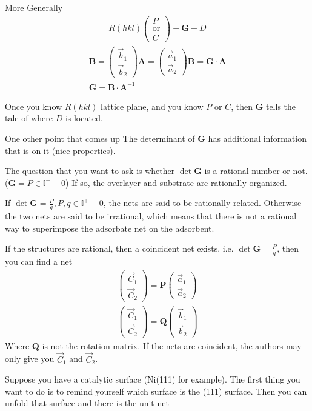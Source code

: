 \documentclass{article}
\newcommand{\matr}[1]{\bm{#1}}
\newcommand{\aone}[0]{\vec{a}_1}
\newcommand{\atwo}[0]{\vec{a}_2}
\newcommand{\bone}[0]{\vec{b}_1}
\newcommand{\btwo}[0]{\vec{b}_2}
\newcommand{\pmat}[1]{\begin{pmatrix}#1\end{pmatrix}}
\begin{document}
\begin{section}{More Generally}
	\begin{align*}
		R(hkl)\pmat{P\\\text{or}\\ C} - \matr{G} - D
	\end{align*}
	\begin{align*}
		\matr{B}=\pmat{\bone\\\btwo}
		\matr{A}=\pmat{\aone\\\atwo}
		\matr{B}=\matr{G}\cdot\matr{A}\\
		\matr{G}=\matr{B}\cdot\matr{A}^{-1}
	\end{align*}

	Once you know $R(hkl)$ lattice plane, and you know $P$ or $C$, then $\matr{G}$ tells the tale of where $D$ is located.

\begin{subsection}{One other point that comes up}
	The determinant of $\matr{G}$ has additional information that is on it (nice properties).

	The question that you want to ask is whether $\det{\matr{G}}$ is a rational number or not. ($\matr{G} = P \in \mathbb{I^+} - {0}$)  If so, the overlayer and substrate are rationally organized.

	If $\det{\matr{G}} = \frac{P}{q}, P,q \in \mathbb{I^+} - {0}$, the nets are said to be rationally related. Otherwise the two nets are said to be irrational, which means that there is not a 
	rational way to superimpose the adsorbate net on the adsorbent.

	If the structures are rational, then a coincident net exists. i.e. $\det{\matr{G}}=\frac{P}{q}$, then you can find a net 
	\begin{align*}
		\pmat{\vec{C}_1\\\vec{C}_2} = \matr{P}\pmat{\aone\\\atwo}\\
		\pmat{\vec{C}_1\\\vec{C}_2} = \matr{Q}\pmat{\bone\\\btwo}
	\end{align*}
	Where $\matr{Q}$ is \underline{not} the rotation matrix. If the nets are coincident, the authors may only give you $\vec{C}_1$ and $\vec{C}_2$. 

\end{subsection}

Suppose you have a catalytic surface (Ni(111) for example). The first thing you want to do is to remind yourself which surface is the (111) surface. Then you can unfold that surface and there is the unit net


\end{section}
\end{document}

